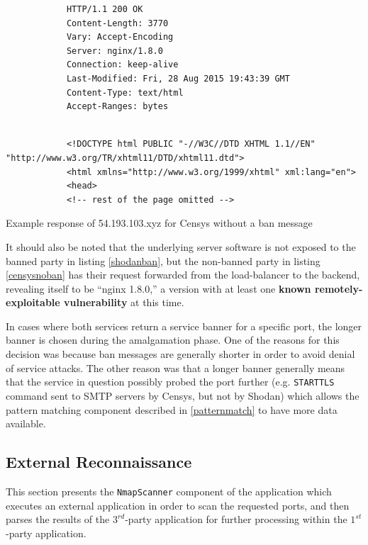\documentclass[a4paper,12pt]{article}
\begin{document}
	\begin{listing}[H]
		\begin{verbatim}
			HTTP/1.1 200 OK
			Content-Length: 3770
			Vary: Accept-Encoding
			Server: nginx/1.8.0
			Connection: keep-alive
			Last-Modified: Fri, 28 Aug 2015 19:43:39 GMT
			Content-Type: text/html
			Accept-Ranges: bytes
		\end{verbatim}
		\vspace{-5pt}
		\begin{verbatim}
			 
			<!DOCTYPE html PUBLIC "-//W3C//DTD XHTML 1.1//EN" "http://www.w3.org/TR/xhtml11/DTD/xhtml11.dtd">
			<html xmlns="http://www.w3.org/1999/xhtml" xml:lang="en">
			<head>
			<!-- rest of the page omitted -->
		\end{verbatim}
		\caption{Example response of 54.193.103.xyz for Censys without a ban message}
		\label{censysnoban}
	\end{listing}

	It should also be noted that the underlying server software is not exposed to the banned party in listing \ref{shodanban}, but the non-banned party in listing \ref{censysnoban} has their request forwarded from the load-balancer to the backend, revealing itself to be ``nginx 1.8.0,'' a version with at least one \textbf{known remotely-exploitable vulnerability}\cite{nginxcve} at this time.

	In cases where both services return a service banner for a specific port, the longer banner is chosen during the amalgamation phase. One of the reasons for this decision was because ban messages are generally shorter\cite{qualys11} in order to avoid denial of service attacks. The other reason was that a longer banner generally means that the service in question possibly probed the port further (e.g. \texttt{STARTTLS} command sent to SMTP servers by Censys, but not by Shodan) which allows the pattern matching component described in \ref{patternmatch} to have more data available.

\subsection{External Reconnaissance} \label{nmapscan}
 

	This section presents the \texttt{NmapScanner} component of the application which executes an external application in order to scan the requested ports, and then parses the results of the $3^{rd}$-party application for further processing within the $1^{st}$-party application.
	
\end{document}
